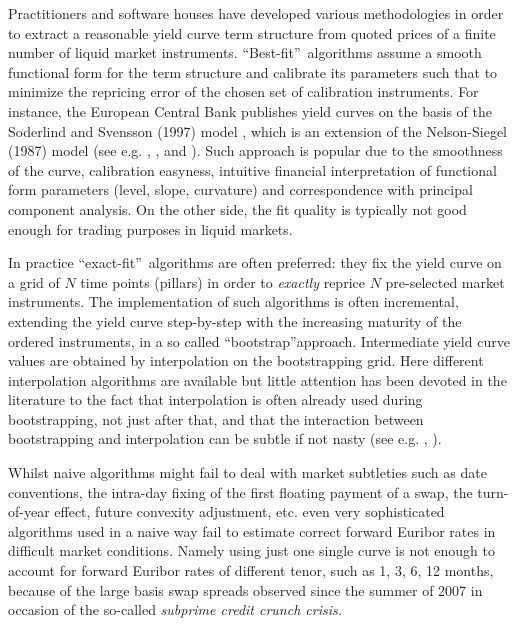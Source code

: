 \documentclass[11pt,reqno]{amsart}
\begin{document}
Practitioners and software houses have developed various methodologies in order to extract a reasonable yield curve term structure from quoted prices of a finite number of liquid market instruments. \textquotedblleft Best-fit\textquotedblright\ algorithms assume a smooth functional form for the term structure and calibrate its parameters such that to minimize the repricing error of the chosen set of calibration instruments. For instance, the European Central Bank publishes yield curves on the basis of the Soderlind and Svensson (1997) model \cite{SoderlindSwensson1997}, which is an extension of the Nelson-Siegel (1987) model (see e.g. \cite{NelsonSiegel}, \cite{Diament}, \cite{ChristensenEtAl2007} and \cite{Coroneo2008}). Such approach is popular due to the smoothness of the curve, calibration easyness, intuitive financial interpretation of functional form parameters (level, slope, curvature) and correspondence with principal component analysis. On the other side, the fit quality is typically not good enough for trading purposes in liquid markets.
\par 
In practice \textquotedblleft exact-fit\textquotedblright\ algorithms are often preferred: they fix the yield curve on a grid of $N$ time points (pillars) in order to \emph{exactly} reprice $N$ pre-selected market instruments. The implementation of such algorithms is often incremental, extending the yield curve step-by-step with the increasing maturity of the ordered instruments, in a so called \textquotedblleft bootstrap\textquotedblright approach. Intermediate yield curve values are obtained by interpolation on the bootstrapping grid. Here different interpolation algorithms are available but little attention has been devoted in the literature to the fact that interpolation is often already used during bootstrapping, not just after that, and that the interaction between bootstrapping and interpolation can be subtle if not nasty (see e.g. \cite{HaganWest2006}, \cite{HaganWest2008}).

Whilst naive algorithms might fail to deal with market subtleties such as date conventions, the intra-day fixing of the first floating payment of a swap, the turn-of-year effect, future convexity adjustment, etc. even very sophisticated algorithms used in a naive way fail to estimate correct forward Euribor rates in difficult market conditions. Namely using just one single curve is not enough to account for forward Euribor rates of different tenor, such as 1, 3, 6, 12 months, because of the large basis swap spreads observed since the summer of 2007 in occasion of the so-called {\it subprime credit crunch crisis.}
\end{document}
